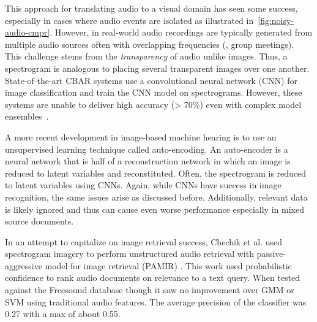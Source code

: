 This approach for translating audio to a visual domain has seen some success,
especially in cases where audio events are isolated as illustrated
in~\cref{fig:noisy-audio-cmpr}.
However, in real-world audio recordings are typically generated from multiple
audio sources often with overlapping frequencies (\eg, group meetings).
This challenge stems from the \textit{transparency} of audio unlike images. 
Thus, a spectrogram is analogous to placing several transparent images 
over one another. 
State-of-the-art CBAR systems use a convolutional neural network (CNN) for 
image classification and
train the CNN model on spectrograms.
However, these systems are unable to deliver high accuracy (> 70\%) even with
complex model ensembles~\cite{xu-large-scale-2018,piczak-environmental-2015}.

A more recent development in image-based machine hearing is to use an
unsupervised learning technique called auto-encoding. An auto-encoder is a
neural network that is half of a reconstruction network in which an image is
reduced to latent variables and reconstituted. Often, the spectrogram is reduced
to latent variables using CNNs. Again, while CNNs have success in image
recognition, the same issues arise as discussed before. Additionally, relevant
data is likely ignored and thus can cause even worse performance especially in
mixed source documents.

In an attempt to capitalize on image retrieval success, Chechik et al. used
spectrogram imagery to perform unstructured audio retrieval with
passive-aggressive model for image retrieval (PAMIR) \cite{Chechik2008}. This
work used probabilistic confidence to rank audio documents on relevance to a
text query. When tested against the Freesound database though it saw no
improvement over GMM or SVM using traditional audio features. The average
precision of the classifier was 0.27 with a max of about 0.55.

